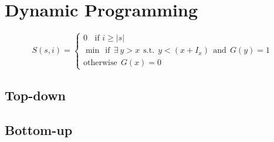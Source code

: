 


\section{Dynamic Programming}

\begin{equation}
	S(s, i) = \begin{cases}
		0 \; \; \text{ if } i \geq |s|  \\
		\min{} \: \: \text{if} \: \: \exists \: y > x \:\: \text{s.t.} \:\: y < (x+I_x) \: \: \text{and} \: \:G(y) = 1\\
		\text{otherwise} \: \: G(x) = 0
	 \end{cases}
	\label{eq:palindrome_partitioning2:dpformula}
\end{equation}

\subsection{Top-down}




\subsection{Bottom-up}